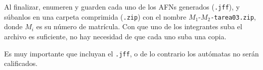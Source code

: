 \documentclass[]{book}
\theoremstyle{definition}
\begin{document}
Al finalizar, enumeren y guarden cada uno de los AFNs generados (\texttt{.jff}), y súbanlos en una carpeta comprimida (\texttt{.zip}) con el nombre $M_1$-$M_2$\texttt{-tarea03.zip}, donde $M_i$ es su número de matrícula.
Con que uno de los integrantes suba el archivo es suficiente, no hay necesidad de que cada uno suba una copia.

Es muy importante que incluyan el \texttt{.jff}, o de lo contrario los autómatas no serán calificados.
\end{document}
